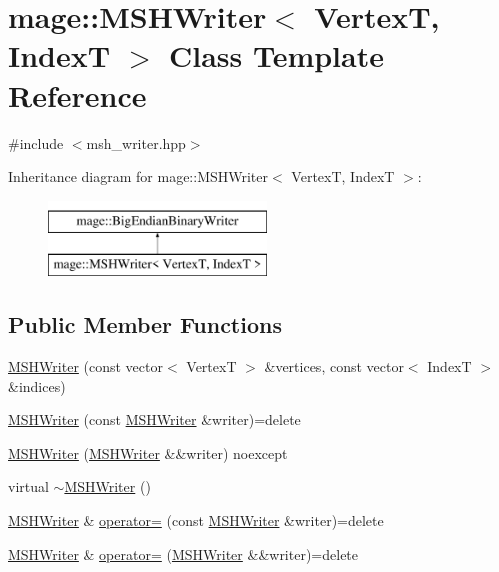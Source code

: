 \hypertarget{classmage_1_1_m_s_h_writer}{}\section{mage\+:\+:M\+S\+H\+Writer$<$ VertexT, IndexT $>$ Class Template Reference}
\label{classmage_1_1_m_s_h_writer}


{\ttfamily \#include $<$msh\+\_\+writer.\+hpp$>$}

Inheritance diagram for mage\+:\+:M\+S\+H\+Writer$<$ VertexT, IndexT $>$\+:\begin{figure}[H]
\begin{center}
\leavevmode
\includegraphics[height=2.000000cm]{classmage_1_1_m_s_h_writer}
\end{center}
\end{figure}
\subsection*{Public Member Functions}
\begin{DoxyCompactItemize}
\item 
\hyperlink{classmage_1_1_m_s_h_writer_a4b74333888706ab61c9d6c3b6fefd4c5}{M\+S\+H\+Writer} (const vector$<$ VertexT $>$ \&vertices, const vector$<$ IndexT $>$ \&indices)
\item 
\hyperlink{classmage_1_1_m_s_h_writer_a19c63d56f07d30b8741e899ba81b0c70}{M\+S\+H\+Writer} (const \hyperlink{classmage_1_1_m_s_h_writer}{M\+S\+H\+Writer} \&writer)=delete
\item 
\hyperlink{classmage_1_1_m_s_h_writer_a723b049cb37039e9b5a91141a897c43d}{M\+S\+H\+Writer} (\hyperlink{classmage_1_1_m_s_h_writer}{M\+S\+H\+Writer} \&\&writer) noexcept
\item 
virtual \hyperlink{classmage_1_1_m_s_h_writer_a75e57bab20c8928b230305118bf9aa5f}{$\sim$\+M\+S\+H\+Writer} ()
\item 
\hyperlink{classmage_1_1_m_s_h_writer}{M\+S\+H\+Writer} \& \hyperlink{classmage_1_1_m_s_h_writer_a0c4f9bbd4a62ef60a38b7a75eb21ea26}{operator=} (const \hyperlink{classmage_1_1_m_s_h_writer}{M\+S\+H\+Writer} \&writer)=delete
\item 
\hyperlink{classmage_1_1_m_s_h_writer}{M\+S\+H\+Writer} \& \hyperlink{classmage_1_1_m_s_h_writer_ad8c9302c6335684ea28d4e47c81a1afb}{operator=} (\hyperlink{classmage_1_1_m_s_h_writer}{M\+S\+H\+Writer} \&\&writer)=delete
\end{DoxyCompactItemize}
